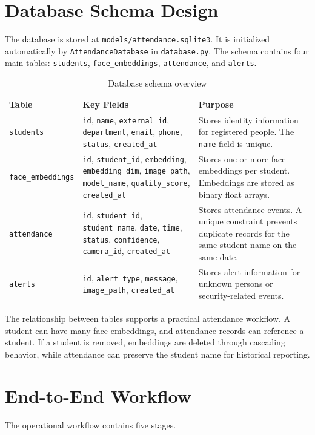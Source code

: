 \documentclass[12pt,a4paper]{report}
\newcommand{\JustifiedNormal}{\fontsize{12}{14}\selectfont\justifying\setlength{\parindent}{0pt}}
\begin{document}
\section{Database Schema Design}
\JustifiedNormal
The database is stored at \texttt{models/attendance.sqlite3}. It is initialized automatically by \texttt{AttendanceDatabase} in \texttt{database.py}. The schema contains four main tables: \texttt{students}, \texttt{face\_embeddings}, \texttt{attendance}, and \texttt{alerts}.

\begin{longtable}{|p{}|p{}|p{}|}
\caption{Database schema overview}\\
\hline
\textbf{Table} & \textbf{Key Fields} & \textbf{Purpose}\\
\hline
\texttt{students} & \texttt{id}, \texttt{name}, \texttt{external\_id}, \texttt{department}, \texttt{email}, \texttt{phone}, \texttt{status}, \texttt{created\_at} & Stores identity information for registered people. The \texttt{name} field is unique.\\
\hline
\texttt{face\_embeddings} & \texttt{id}, \texttt{student\_id}, \texttt{embedding}, \texttt{embedding\_dim}, \texttt{image\_path}, \texttt{model\_name}, \texttt{quality\_score}, \texttt{created\_at} & Stores one or more face embeddings per student. Embeddings are stored as binary float arrays.\\
\hline
\texttt{attendance} & \texttt{id}, \texttt{student\_id}, \texttt{student\_name}, \texttt{date}, \texttt{time}, \texttt{status}, \texttt{confidence}, \texttt{camera\_id}, \texttt{created\_at} & Stores attendance events. A unique constraint prevents duplicate records for the same student name on the same date.\\
\hline
\texttt{alerts} & \texttt{id}, \texttt{alert\_type}, \texttt{message}, \texttt{image\_path}, \texttt{created\_at} & Stores alert information for unknown persons or security-related events.\\
\hline
\end{longtable}

The relationship between tables supports a practical attendance workflow. A student can have many face embeddings, and attendance records can reference a student. If a student is removed, embeddings are deleted through cascading behavior, while attendance can preserve the student name for historical reporting.

\section{End-to-End Workflow}
\JustifiedNormal
The operational workflow contains five stages.
\end{document}
